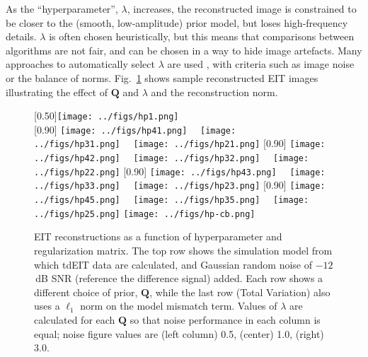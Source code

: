 \documentclass[12pt]{article} \usepackage[margin=3cm]{geometry} \usepackage[margin=20pt,font=small,labelfont=bf]{caption}\def\TBLWIDA{35mm}\def\TBLWIDB{95mm}
\newcommand\Fref[1]{Fig.\ \ref{#1}}
\newcommand{\QB}{\mathbf{Q}}
\begin{document}
As the ``hyperparameter'', $\lambda$,
increases, the reconstructed image is constrained to be closer to
the (smooth, low-amplitude) prior model, but loses high-frequency
details. $\lambda$ is often chosen heuristically, but this means
that comparisons between algorithms are not fair, and can be
chosen in a way to hide image artefacts. Many approaches to automatically
select $\lambda$ are used \cite{Braun2017Hyperparameter}, with
criteria such as image noise or the balance of norms.
\Fref{fig:regularization_comparison} shows sample reconstructed
EIT images illustrating the effect of $\QB$ and $\lambda$ and
the reconstruction norm.

\begin{figure} \centering
% 
   [0.50\columnwidth]{\texttt{[image: ../figs/hp1.png]}}\\
   [0.90\columnwidth]{%
      \texttt{[image: ../figs/hp41.png]}~~%
      \texttt{[image: ../figs/hp31.png]}~~%
      \texttt{[image: ../figs/hp21.png]}}\hfil%
   [0.90\columnwidth]{%
      \texttt{[image: ../figs/hp42.png]}~~%
      \texttt{[image: ../figs/hp32.png]}~~%
      \texttt{[image: ../figs/hp22.png]}}\hfil%
   [0.90\columnwidth]{%
      \texttt{[image: ../figs/hp43.png]}~~%
      \texttt{[image: ../figs/hp33.png]}~~%
      \texttt{[image: ../figs/hp23.png]}}\hfil%
   [0.90\columnwidth]{%
      \texttt{[image: ../figs/hp45.png]}~~%
      \texttt{[image: ../figs/hp35.png]}~~%
      \texttt{[image: ../figs/hp25.png]}}\hfil%
   \centering \texttt{[image: ../figs/hp-cb.png]}\\
\caption{%
EIT reconstructions as a function of hyperparameter
and regularization matrix. The top row shows the simulation model
from which tdEIT data are calculated, and Gaussian random noise
of $-12$\,dB SNR (reference the difference signal) added.
Each row shows a different choice of prior, $\QB$, while the
last row (Total Variation) also uses a $\ell_1$ norm on the model mismatch term.
Values of $\lambda$ are calculated for each $\QB$ so that noise performance
in each column is equal; noise figure values are (left column) 0.5,
(center) 1.0, 
(right) 3.0.
}
\label{fig:regularization_comparison}
\end{figure}
\end{document}
